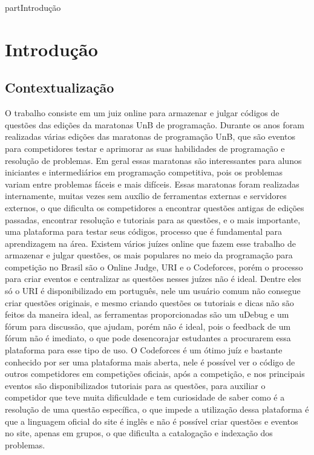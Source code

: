 part{Introdução}

\chapter[Introdução]{Introdução}

\section{Contextualização}

O trabalho consiste em um juiz online para armazenar e julgar códigos de questões das edições da maratonas UnB de programação. 
Durante os anos foram realizadas várias edições das maratonas de programação UnB, que são eventos para competidores testar e aprimorar as suas habilidades de programação e resolução de problemas. Em geral essas maratonas são interessantes para alunos iniciantes e intermediários em programação competitiva, pois os problemas variam entre problemas fáceis e mais difíceis. Essas maratonas foram realizadas internamente, muitas vezes sem auxílio de ferramentas externas e servidores externos, o que dificulta os competidores a encontrar questões antigas de edições passadas, encontrar resolução e tutoriais para as questões, e o mais importante, uma plataforma para testar seus códigos, processo que é fundamental para aprendizagem na área. 
Existem vários juízes online que fazem esse trabalho de armazenar e julgar questões, os mais populares no meio da programação para competição no Brasil são o Online Judge, URI e o Codeforces, porém o processo para criar eventos e centralizar as questões nesses juízes não é ideal. Dentre eles só o URI é disponibilizado em português, nele um usuário comum não consegue criar questões originais, e mesmo criando questões os tutoriais e dicas não são feitos da maneira ideal, as ferramentas proporcionadas são um uDebug e um fórum para discussão, que ajudam, porém não é ideal, pois o feedback de um fórum não é imediato, o que pode desencorajar estudantes a procurarem essa plataforma para esse tipo de uso. O Codeforces é um ótimo juíz e bastante conhecido por ser uma plataforma mais aberta, nele é possível ver o código de outros competidores em competições oficiais, após a competição, e nos principais eventos são disponibilizados tutoriais para as questões, para auxiliar o competidor que teve muita dificuldade e tem curiosidade de saber como é a resolução de uma questão específica, o que impede a utilização dessa plataforma é que a linguagem oficial do site é inglês e não é possível criar questões e eventos no site, apenas em grupos, o que dificulta a catalogação e indexação dos problemas.
